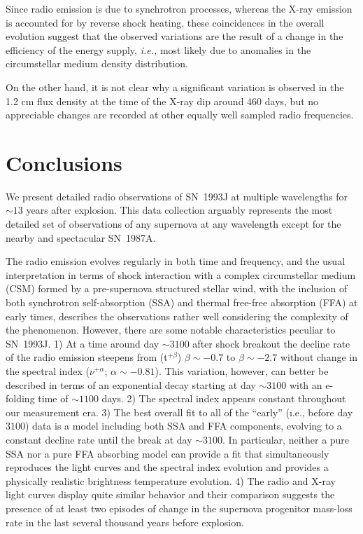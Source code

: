 \documentclass[12pt,preprint]{aastex}
\newcommand{\ie}{{\it i.e., }}
\begin{document}
Since radio emission is due to synchrotron processes, whereas the X-ray
emission is accounted for by reverse shock heating, these coincidences
in the overall evolution suggest that the observed variations are the
result of a change in the efficiency of the energy supply, \ie most
likely due to anomalies in the circumstellar medium density
distribution. 

On the other hand, it is not clear why a significant variation is
observed in the 1.2 cm flux density at the time of the  X-ray dip around
460 days, but no appreciable changes are recorded at other equally well 
sampled radio frequencies.

\section{Conclusions}

We present detailed radio observations of SN~1993J at multiple wavelengths for $\sim13$ years after explosion. This data collection arguably represents the most detailed set of observations of any supernova at any wavelength except for the nearby and spectacular SN~1987A.

The radio emission evolves regularly in both time and frequency, and the usual interpretation in terms of shock interaction with a complex circumstellar medium (CSM) formed by a pre-supernova structured stellar wind, with the inclusion of both synchrotron self-absorption (SSA) and thermal free-free absorption (FFA) at early times, describes the observations rather well considering the complexity of the phenomenon.  However, there are some notable characteristics peculiar to SN~1993J. 1) At a time around day $\sim3100$ after shock breakout the decline rate of the radio emission steepens from (t$^{+\beta}$) $\beta \sim -0.7$ to $\beta \sim -2.7$ without change in the spectral index ($\nu^{+\alpha}$; $\alpha \sim -0.81$). This variation, however, can better be described in terms of an exponential decay starting at day $\sim3100$ with an e-folding time of $\sim 1100$ days. 2) The spectral index appears constant throughout our measurement era. 3) The best overall fit to all of the ``early'' (\i.e., before day 3100) data is a model including  both SSA and FFA components, evolving to a constant decline rate until the break at day $\sim3100$. In particular, neither a pure SSA nor a pure FFA absorbing model can provide a  fit that simultaneously reproduces the light curves and the spectral index evolution and provides a physically realistic brightness temperature evolution. 4) The radio and X-ray light curves display quite similar behavior and their comparison suggests the presence of at least two episodes of change in the supernova progenitor mass-loss rate in the last several thousand years before explosion.
\end{document}
